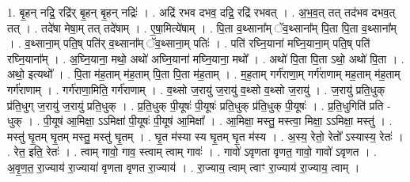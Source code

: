 \documentclass[17pt]{extarticle}
\begin{document}
1. बृ॒हन् नद्रि॒ रद्रि॑र् बृ॒हन् बृ॒हन् नद्रिः॑ । . अद्रि॑ रभव दभव॒ दद्रि॒ रद्रि॑ रभवत् । . अ॒भ॒व॒त् तत् तद॑भव दभव॒त् तत् । . तदे॑षा मेषा॒म् तत् तदे॑षाम् । . ए॒षा॒मित्ये॑षाम् । . पि॒ता व॒थ्साना᳚म् ॅव॒थ्साना᳚म् पि॒ता पि॒ता व॒थ्साना᳚म् । . व॒थ्साना॒म् पति॒ष् पति॑र् व॒थ्साना᳚म् ॅव॒थ्साना॒म् पतिः॑ । . पति॑ रघ्नि॒याना॑ मघ्नि॒याना॒म् पति॒ष् पति॑ रघ्नि॒याना᳚म् । . अ॒घ्नि॒याना॒ मथो॒ अथो॑ अघ्नि॒याना॑ मघ्नि॒याना॒ मथो᳚ । . अथो॑ पि॒ता पि॒ता ऽथो॒ अथो॑ पि॒ता । . अथो॒ इत्यथो᳚ । . पि॒ता म॑ह॒ताम् म॑ह॒ताम् पि॒ता पि॒ता म॑ह॒ताम् । . म॒ह॒ताम् गर्ग॑राणा॒म् गर्ग॑राणाम् मह॒ताम् म॑ह॒ताम् गर्ग॑राणाम् । . गर्ग॑राणा॒मिति॒ गर्ग॑राणाम् । . व॒थ्सो ज॒रायु॑ ज॒रायु॑ व॒थ्सो व॒थ्सो ज॒रायु॑ । . ज॒रायु॑ प्रति॒धुक् प्र॑ति॒धुग् ज॒रायु॑ ज॒रायु॑ प्रति॒धुक् । . प्र॒ति॒धुक् पी॒यूषः॑ पी॒यूषः॑ प्रति॒धुक् प्र॑ति॒धुक् पी॒यूषः॑ । . प्र॒ति॒धुगिति॑ प्रति - धुक् । . पी॒यूष॑ आ॒मिक्षा॒ ऽऽमिक्षा॑ पी॒यूषः॑ पी॒यूष॑ आ॒मिक्षा᳚ । . आ॒मिक्षा॒ मस्तु॒ मस्त्वा॒ मिक्षा॒ ऽऽमिक्षा॒ मस्तु॑ । . मस्तु॑ घृ॒तम् घृ॒तम् मस्तु॒ मस्तु॑ घृ॒तम् । . घृ॒त म॑स्या स्य घृ॒तम् घृ॒त म॑स्य । . अ॒स्य॒ रेतो॒ रेतो᳚ ऽस्यास्य॒ रेतः॑ । . रेत॒ इति॒ रेतः॑ । . त्वाम् गावो॒ गाव॒ स्त्वाम् त्वाम् गावः॑ । . गावो॑ ऽवृणता वृणत॒ गावो॒ गावो॑ ऽवृणत । . अ॒वृ॒ण॒त॒ रा॒ज्याय॑ रा॒ज्याया॑ वृणता वृणत रा॒ज्याय॑ । . रा॒ज्याय॒ त्वाम् त्वाꣳ रा॒ज्याय॑ रा॒ज्याय॒ त्वाम् । \newline
\end{document}
